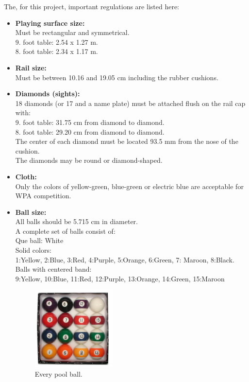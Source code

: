The, for this project, important regulations are listed here\cite{poolregulations}:
\begin{itemize}
	\item \textbf{Playing surface size:}\\
		Must be rectangular and symmetrical.\\
		9. foot table: 2.54 x 1.27 m.\\
		8. foot table: 2.34 x 1.17 m.\\
	\item \textbf{Rail size:}\\
		Must be between 10.16 and 19.05 cm including the rubber cushions.\\
	\item \textbf{Diamonds (sights):}\\
		18 diamonds (or 17 and a name plate) must be attached flush on the rail cap with:\\
		9. foot table: 31.75 cm from diamond to diamond.\\
		8. foot table: 29.20 cm from diamond to diamond.\\
		The center of each diamond must be located 93.5 mm from the nose of the cushion.\\
		The diamonds may be round or diamond-shaped.\\
	\item \textbf{Cloth:}\\
		Only the colors of yellow-green, blue-green or electric blue are acceptable for WPA competition. \\
	\item \textbf{Ball size:}\\
		All balls should be 5.715 cm in diameter.\\
		A complete set of balls consist of:\\
		Que ball: White\\
		Solid colors:\\
		\hspace*{10 mm}	1:Yellow, 2:Blue, 3:Red, 4:Purple, 5:Orange, 6:Green, 7: Maroon, 8:Black.\\
		Balls with centered band:\\
		\hspace*{10 mm}	9:Yellow, 10:Blue, 11:Red, 12:Purple, 13:Orange, 14:Green, 15:Maroon\\
		
		\begin{figure}[H]
		\begin{center}
		\leavevmode
		\includegraphics[width=0.4\textwidth]{images/poolballs.jpg}
		\end{center}
		\caption{Every pool ball.}
		\label{fig:poolballs}
		\end{figure}	
		

\end{itemize}
